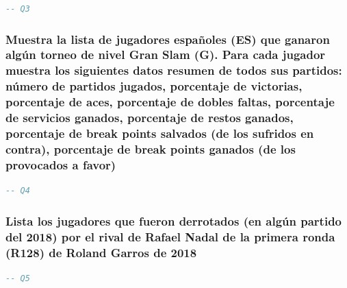 \documentclass[10pt]{opticajnl}
\begin{document}
\begin{lstlisting}[language=SQL]
-- Q3
\end{lstlisting}





\subsubsection{Muestra la lista de jugadores españoles (ES) que ganaron algún torneo de nivel Gran Slam (G). Para cada jugador muestra los siguientes datos resumen de todos sus partidos: número de partidos jugados, porcentaje de victorias, porcentaje de aces, porcentaje de dobles faltas, porcentaje de servicios ganados, porcentaje de restos ganados, porcentaje de break points salvados (de los sufridos en contra), porcentaje de break points ganados (de los provocados a favor)}

\begin{lstlisting}[language=SQL]
-- Q4
\end{lstlisting}





\subsubsection{Lista los jugadores que fueron derrotados (en algún partido del 2018) por el rival de Rafael Nadal de la primera ronda (R128) de Roland Garros de 2018}

\begin{lstlisting}[language=SQL]
-- Q5
\end{lstlisting}
    
    
\end{document}
